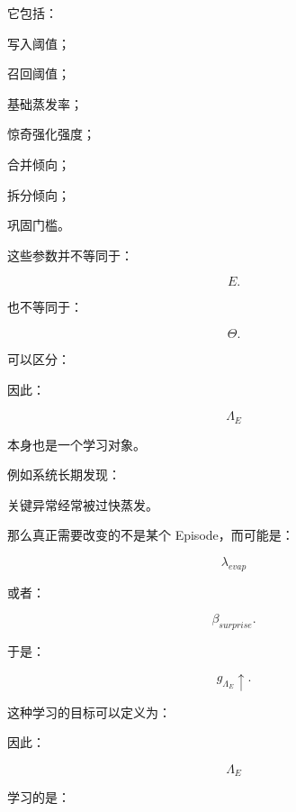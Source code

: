 它包括：

写入阈值；

召回阈值；

基础蒸发率；

惊奇强化强度；

合并倾向；

拆分倾向；

巩固门槛。

这些参数并不等同于：

\[
E.
\]

也不等同于：

\[
\Theta.
\]

可以区分：

\begin{statementbox}
\centering
{}
\end{statementbox}

\begin{statementbox}
\centering
{}
\end{statementbox}

因此：

\[
\Lambda_E
\]

本身也是一个学习对象。

例如系统长期发现：

关键异常经常被过快蒸发。

那么真正需要改变的不是某个 Episode，而可能是：

\[
\lambda_{evap}
\]

或者：

\[
\beta_{surprise}.
\]

于是：

\[
\boxed{
g_{\Lambda_E}\uparrow.
}
\]

这种学习的目标可以定义为：

\begin{statementbox}
\centering
{}
\end{statementbox}

因此：

\[
\boxed{
\Lambda_E
}
\]

学习的是：

\begin{statementbox}
\centering
{}
\end{statementbox}

